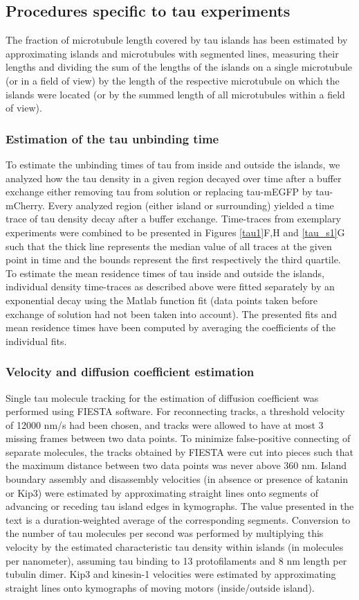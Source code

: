 \subsection{Procedures specific to tau experiments}
The fraction of microtubule length covered by tau islands has been estimated by approximating islands and microtubules with segmented lines, measuring their lengths and dividing the sum of the lengths of the islands on a single microtubule (or in a field of view) by the length of the respective microtubule on which the islands were located (or by the summed length of all microtubules within a field of view).
\subsubsection{Estimation of the tau unbinding time}
To estimate the unbinding times of tau from inside and outside the islands, we analyzed how the tau density in a given region decayed over time after a buffer exchange either removing tau from solution or replacing tau-mEGFP by tau-mCherry. Every analyzed region (either island or surrounding) yielded a time trace of tau density decay after a buffer exchange. Time-traces from exemplary experiments were combined to be presented in Figures \ref{tau1}F,H and \ref{tau_s1}G  such that the thick line represents the median value of all traces at the given point in time and the bounds represent the first respectively the third quartile. To estimate the mean residence times of tau inside and outside the islands, individual density time-traces as described above were fitted separately by an exponential decay using the Matlab function fit (data points taken before exchange of solution had not been taken into account). The presented fits and mean residence times have been computed by averaging the coefficients of the individual fits.
\subsubsection{Velocity and diffusion coefficient estimation} 
Single tau molecule tracking for the estimation of diffusion coefficient was performed using FIESTA\parencite{RUHNOW20112820} software. For reconnecting tracks, a threshold velocity of 12000 nm/s had been chosen, and tracks were allowed to have at most 3 missing frames between two data points. To minimize false-positive connecting of separate molecules, the tracks obtained by FIESTA were cut into pieces such that the maximum distance between two data points was never above 360 nm. Island boundary assembly and disassembly velocities (in absence or presence of katanin or Kip3) were estimated by approximating straight lines onto segments of advancing or receding tau island edges in kymographs. The value presented in the text is a duration-weighted average of the corresponding segments. Conversion to the number of tau molecules per second was performed by multiplying this velocity by the estimated characteristic tau density within islands (in molecules per nanometer), assuming tau binding to 13 protofilaments and 8 nm length per tubulin dimer. Kip3 and kinesin-1 velocities were estimated by approximating straight lines onto kymographs of moving motors (inside/outside island). 
